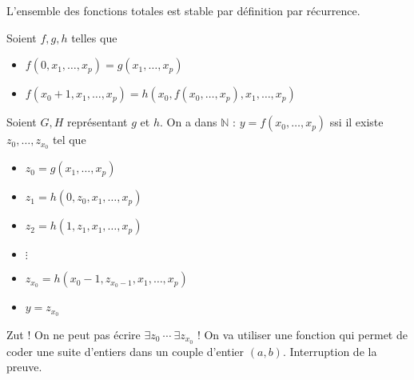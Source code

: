 \documentclass[./main]{subfiles}
\begin{document}
 \begin{lem}
   L'ensemble des fonctions totales est stable par définition par récurrence.
   \label{lem:repr-rec}
 \end{lem}
 \begin{prv}
   Soient $f, g, h$ telles que 
    \begin{itemize}
     \item $f(0, x_1, \ldots, x_p) = g(x_1, \ldots, x_p)$
     \item $f(x_0 + 1, x_1, \ldots, x_p) = h(x_0, f(x_0, \ldots, x_p), x_1, \ldots, x_p)$
   \end{itemize}
   Soient $G, H$ représentant $g$ et $h$.
   On a dans $\mathds{N}$ : $y = f(x_0, \ldots, x_p)$ ssi il existe $z_0, \ldots, z_{x_0}$ tel que 
   \begin{itemize}
     \item $z_0 = g(x_1, \ldots, x_p)$
     \item $z_1 = h(0, z_0, x_1, \ldots, x_p)$
     \item $z_2 = h(1, z_1, x_1, \ldots, x_p)$
     \item $\vdots$ 
     \item $z_{x_0} = h(x_0-1, z_{x_0 - 1}, x_1, \ldots, x_p)$
     \item $y = z_{x_0}$
   \end{itemize}
   Zut ! On ne peut pas écrire $\exists z_0 \: \cdots \: \exists z_{x_0}$ !
   On va utiliser une fonction qui permet de coder une suite d'entiers dans un couple d'entier $(a,b)$.
   Interruption de la preuve. 
 \end{prv}
\end{document}
